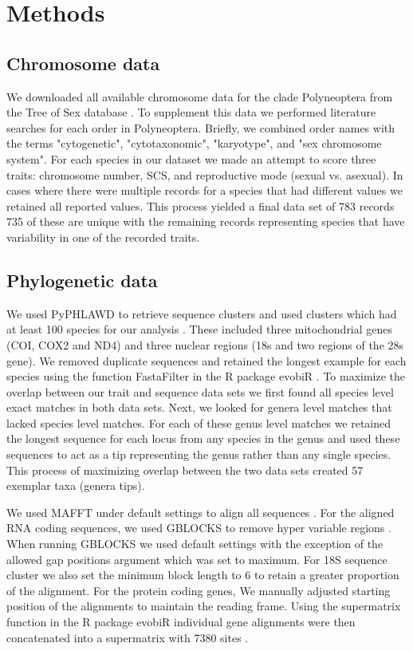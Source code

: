 \section{Methods}

\subsection{Chromosome data}
We downloaded all available chromosome data for the clade Polyneoptera from the Tree of Sex database \citep{blackmon2016,TOS2014}.
To supplement this data we performed literature searches for each order in Polyneoptera.
Briefly, we combined order names with the terms "cytogenetic", "cytotaxonomic", "karyotype", and "sex chromosome system". %
For each species in our dataset we made an attempt to score three traits: chromosome number, SCS, and reproductive mode (sexual vs. asexual).
In cases where there were multiple records for a species that had different values we retained all reported values.
This process yielded a final data set of 783 records 735 of these are unique with the remaining records representing species that have variability in one of the recorded traits. 

\subsection{Phylogenetic data}
We used PyPHLAWD to retrieve sequence clusters and used clusters which had at least 100 species for our analysis \citep{smith2018phyphlawd}. 
These included three mitochondrial genes (COI, COX2 and ND4) and three nuclear regions (18s and two regions of the 28s gene). 
We removed duplicate sequences and retained the longest example for each species using the function FastaFilter in the R package evobiR \citep{blackmon2015evobir}.
To maximize the overlap between our trait and sequence data sets we first found all species level exact matches in both data sets.
Next, we looked for genera level matches that lacked species level matches.
For each of these genus level matches we retained the longest sequence for each locus from any species in the genus and used these sequences to act as a tip representing the genus rather than any single species. 
This process of maximizing overlap between the two data sets created 57 exemplar taxa (genera tips).

We used MAFFT under default settings to align all sequences \citep{katoh2013mafft}.
For the aligned RNA coding sequences, we used GBLOCKS to remove hyper variable regions \citep{castresana2000gblocks}. 
When running GBLOCKS we used default settings with the exception of the allowed gap positions argument which was set to maximum. 
For 18S sequence cluster we also set the minimum block length to 6 to retain a greater proportion of the alignment. 
For the protein coding genes, We manually adjusted starting position of the alignments to maintain the reading frame. 
Using the supermatrix function in the R package evobiR individual gene alignments were then concatenated into a supermatrix with 7380 sites \citep{blackmon2015evobir}.

